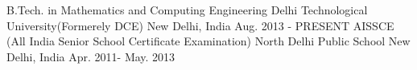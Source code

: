 \begin{cventries}
  \cventry
    {B.Tech. in Mathematics and Computing Engineering}
    {Delhi Technological University(Formerely DCE)}
    {New Delhi, India}
    {Aug. 2013 - PRESENT}
    {}
  \cventry
    {AISSCE (All India Senior School Certificate Examination)}
    {North Delhi Public School}
    {New Delhi, India}
    {Apr. 2011- May. 2013}
    {}
\end{cventries}
